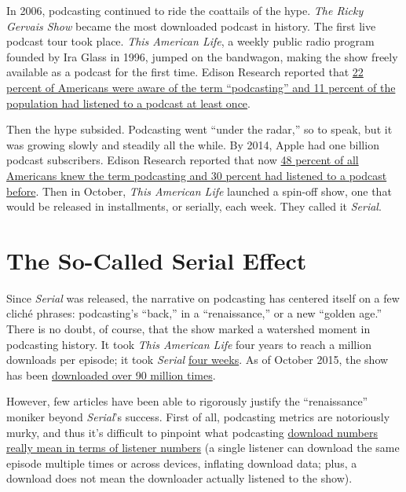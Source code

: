 \documentclass[notoc, symmetric, nobib, nols]{towcenter-guideto-book}
\begin{document}
In 2006, podcasting continued to ride the coattails of the hype. \textit{The Ricky Gervais Show} became the most downloaded podcast in history. The first live podcast tour took place.\autocite{PCHistoryWiki} \textit{This American Life}, a weekly public radio program founded by Ira Glass in 1996, jumped on the bandwagon, making the show freely available as a podcast for the first time. Edison Research reported that \href{http://www.edisonresearch.com/the-podcast-consumer-2015/}{22 percent of Americans were aware of the term ``podcasting'' and 11 percent of the population had listened to a podcast at least once}.\autocite{EdPCconsumer}

Then the hype subsided. Podcasting went ``under the radar,'' so to speak, but it was growing slowly and steadily all the while. By 2014, Apple had one billion podcast subscribers. Edison Research reported that now \href{http://www.edisonresearch.com/the-podcast-consumer-2015/}{48 percent of all Americans knew the term podcasting and 30 percent had listened to a podcast before}.\autocite{EdPCconsumer} Then in October, \textit{This American Life} launched a spin-off show, one that would be released in installments, or serially, each week. They called it \textit{Serial}. 

\section{The So-Called Serial Effect}

Since \textit{Serial} was released, the narrative on podcasting has centered itself on a few cliché phrases: podcasting's ``back,'' in a ``renaissance,'' or a new ``golden age.'' There is no doubt, of course, that the show marked a watershed moment in podcasting history. It took \textit{This American Life} four years to reach a million downloads per episode; it took \textit{Serial} \href{http://longform.org/posts/longform-podcast-159-ira-glass}{four weeks}.\autocite{IraLongform} As of October 2015, the show has been \href{http://www.nytimes.com/2015/10/01/business/media/after-serial-what-podcasts-to-listen-to.html}{downloaded over 90 million times}.\autocite{NYTAfterSerial} 

However, few articles have been able to rigorously justify the ``renaissance'' moniker beyond \textit{Serial}'s success. First of all, podcasting metrics are notoriously murky, and thus it's difficult to pinpoint what podcasting \href{https://medium.com/@pete/downloads-listens-listeners-and-about-those-podcast-numbers-73a5ee3e2fca}{download numbers really mean in terms of listener numbers} (a single listener can download the same episode multiple times or across devices, inflating download data; plus, a download does not mean the downloader actually listened to the show).\autocite{DLvsListen} 
\end{document}
